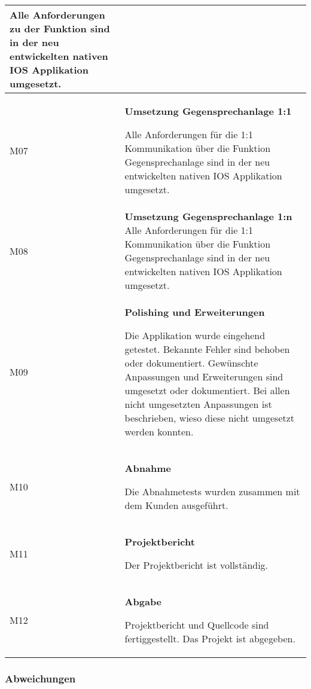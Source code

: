 \begin{table}[h]
\begin{tabular}{|l|p{15cm}|}
        Alle Anforderungen zu der  Funktion sind in der neu entwickelten nativen IOS Applikation umgesetzt. \\
        \hline

        M07         & \textbf{Umsetzung Gegensprechanlage 1:1}

        Alle Anforderungen für die 1:1 Kommunikation über die Funktion Gegensprechanlage sind in der neu entwickelten nativen IOS Applikation umgesetzt. \\
        \hline

        M08         & \textbf{Umsetzung Gegensprechanlage 1:n}
        Alle Anforderungen für die 1:1 Kommunikation über die Funktion Gegensprechanlage sind in der neu entwickelten nativen IOS Applikation umgesetzt. \\
        \hline

        M09         & \textbf{Polishing und Erweiterungen}

        Die Applikation wurde eingehend getestet.
        Bekannte Fehler sind behoben oder dokumentiert.
        Gewünschte Anpassungen und Erweiterungen sind umgesetzt oder dokumentiert.
        Bei allen nicht umgesetzten Anpassungen ist beschrieben, wieso diese nicht umgesetzt werden konnten.
        \\
        \hline

        M10         & \textbf{Abnahme}

        Die Abnahmetests wurden zusammen mit dem Kunden ausgeführt. \\
        \hline

        M11         & \textbf{Projektbericht}

        Der Projektbericht ist vollständig.\\
        \hline

        M12         & \textbf{Abgabe}

        Projektbericht und Quellcode sind fertiggestellt.
        Das Projekt ist abgegeben.\\
        \hline



    \end{tabular}\label{tab:milestones}
\end{table}

\subsubsection{Abweichungen}

